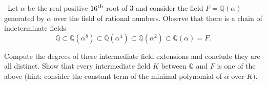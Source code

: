 \documentclass[12pt]{AlgebraQual}
\begin{document}
\newpage




\begin{problem} $\,$
Let $\alpha$ be the real positive $16^\text{th}$ root of $3$ and consider the field $F=\mathbb{Q}(\alpha)$ generated by $\alpha$ over the field of rational numbers. Observe that there is a chain of indeterminate fields $$\mathbb{Q}\subset\mathbb{Q}(\alpha^8)\subset\mathbb{Q}(\alpha^4)\subset\mathbb{Q}(\alpha^2)\subset\mathbb{Q}(\alpha)=F.$$

Compute the degrees of these intermediate field extensions and conclude they are all distinct. Show that every intermediate field $K$ between $\mathbb{Q}$ and $F$ is one of the above (hint: consider the constant term of the minimal polynomial of $\alpha$ over $K).$
\end{problem}
\end{document}
